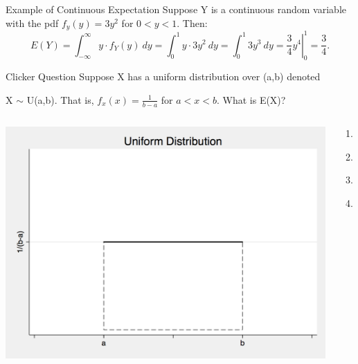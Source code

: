 \documentclass{beamer}
\begin{document}
\begin{frame}{Example of Continuous Expectation}
	Suppose Y is a continuous random variable with the pdf $f_y(y)=3y^2$ for $0<y<1$. Then:
	\small{\[ E(Y) = \int_{-\infty}^{\infty}y\cdot f_Y(y) \ dy = \int_{0}^{1}y \cdot 3y^2 \ dy = \int_{0}^{1} 3y^3 \ dy = \left.\frac{3}{4}y^4\right|_0^1  = \frac{3}{4}. \]}
\end{frame}

\begin{frame}{Clicker Question}
	Suppose X has a \alert{uniform distribution} over (a,b) denoted 

	X $\sim$ U(a,b). That is, $f_x(x) = \frac{1}{b-a}$ for $a<x<b$. What is E(X)?
	
	\vspace{5mm}
	\begin{columns}
		\begin{column}{0.6\textwidth}{
				\centering 
				\includegraphics[width=\textwidth]{uniformab.png}}
		\end{column}
		\begin{column}{0.4\textwidth}{
				\begin{enumerate}[label=(\alph*)]
					\item $\frac{b-a}{2}$
					\item $\frac{b+a}{2}$
					\item $\frac{1}{b-a}$
					\item $1$
				\end{enumerate}}
		\end{column}
	\end{columns}
\end{frame}
\end{document}
